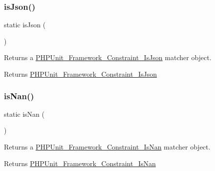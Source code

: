 \subsubsection{\texorpdfstring{is\+Json()}{isJson()}}
{\footnotesize\ttfamily static is\+Json (\begin{DoxyParamCaption}{ }\end{DoxyParamCaption})\hspace{0.3cm}{\ttfamily [static]}}

Returns a \mbox{\hyperlink{class_p_h_p_unit___framework___constraint___is_json}{P\+H\+P\+Unit\+\_\+\+Framework\+\_\+\+Constraint\+\_\+\+Is\+Json}} matcher object.

\begin{DoxyReturn}{Returns}
\mbox{\hyperlink{class_p_h_p_unit___framework___constraint___is_json}{P\+H\+P\+Unit\+\_\+\+Framework\+\_\+\+Constraint\+\_\+\+Is\+Json}} 
\end{DoxyReturn}
\mbox{\label{class_p_h_p_unit___framework___assert_a4c62604014a69d13ca70d0b35e94092a}} 
\subsubsection{\texorpdfstring{is\+Nan()}{isNan()}}
{\footnotesize\ttfamily static is\+Nan (\begin{DoxyParamCaption}{ }\end{DoxyParamCaption})\hspace{0.3cm}{\ttfamily [static]}}

Returns a \mbox{\hyperlink{class_p_h_p_unit___framework___constraint___is_nan}{P\+H\+P\+Unit\+\_\+\+Framework\+\_\+\+Constraint\+\_\+\+Is\+Nan}} matcher object.

\begin{DoxyReturn}{Returns}
\mbox{\hyperlink{class_p_h_p_unit___framework___constraint___is_nan}{P\+H\+P\+Unit\+\_\+\+Framework\+\_\+\+Constraint\+\_\+\+Is\+Nan}} 
\end{DoxyReturn}
\mbox{\label{class_p_h_p_unit___framework___assert_a84113959d7b6e3a8f79f3d4e6d3ff792}} 
